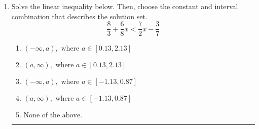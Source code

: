 \documentclass[14pt]{extbook}
\newcommand{\litem}[1]{\item#1\hspace*{-1cm}\rule{\textwidth}{0.4pt}}
\begin{document}
\begin{enumerate}
{\begin{enumerate}[label=\Alph*.]
\end{enumerate} }
\litem{
Solve the linear inequality below. Then, choose the constant and interval combination that describes the solution set.\[ \frac{8}{3} + \frac{6}{8} x < \frac{7}{2} x - \frac{3}{7} \]\begin{enumerate}[label=\Alph*.]
\item \( (-\infty, a), \text{ where } a \in [0.13, 2.13] \)
\item \( (a, \infty), \text{ where } a \in [0.13, 2.13] \)
\item \( (-\infty, a), \text{ where } a \in [-1.13, 0.87] \)
\item \( (a, \infty), \text{ where } a \in [-1.13, 0.87] \)
\item \( \text{None of the above}. \)

\end{enumerate} }
\end{enumerate}
\end{document}
